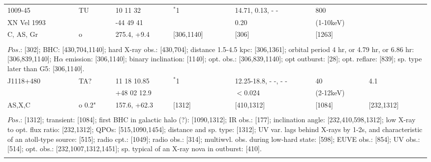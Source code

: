 \documentclass{aa}
\begin{document}
\begin{tabular}{p{2.5cm}p{1cm}p{1.8cm}p{2.3cm}p{3.3cm}p{2.0cm}p{2.2cm}}
\noalign{\smallskip}
1009-45            &   TU       & 10 11 32       & $^*$1             & 14.71, 0.13, - -  & 800                 &     \\                
XN Vel 1993    &                & -44 49 41     &                        & 0.20                    & (1-10keV)      &     \\
C, AS, Gr         &  o            & 275.4, +9.4  & [306,1140]    & [306]                  & [1263]            &     \\
\\
\multicolumn{7}{p{17.5cm}}{
$Pos$.: [302]; BHC: [430,704,1140]; hard X-ray obs.: [430,704]; distance 1.5-4.5 kpc: [306,1361]; 
orbital period 4 hr, or 4.79 hr, or 6.86 hr: [306,839,1140]; H$\alpha$ emission: [306,1140]; binary inclination: 
[1140]; opt. obs.: [306,839,1140]; opt outburst: [28]; opt. reflare: [839]; sp. type later than G5: [306,1140].}\\
\noalign{\smallskip}
\hline

\noalign{\smallskip}
J1118+480 & TA?       & 11 18 10.85   & $^*$1      & 12.25-18.8, - -, - - & 40                    & 4.1                   \\
                     &                 & +48 02 12.9  &                 & $<$0.024              & (2-12keV)       &                         \\
AS,X,C        & o 0.2"    & 157.6, +62.3  & [1312]     & [410,1312]            & [1084]             & [232,1312]   \\
\\
\multicolumn{7}{p{17.5cm}}{
$Pos$.: [1312]; transient: [1084]; first BHC in galactic halo (?): [1090,1312]; 
IR obs.: [177];  inclination angle: [232,410,598,1312]; low X-ray to 
opt. flux ratio: [232,1312]; QPOs: [515,1090,1454]; distance and sp. type: [1312]; 
UV var. lags behind X-rays by 1-2s, and characteristic of an atoll-type source: [515]; 
radio cpt.: [1049]; radio obs.: [314]; multiwvl. obs. during low-hard state: [598]; EUVE obs.: 
[854]; UV obs.: [514]; opt. obs.: [232,1007,1312,1451]; sp. typical of an X-ray nova in outburst: [410].}\\
\noalign{\smallskip}
\hline


\end{tabular}
\end{document}
